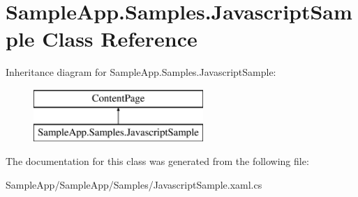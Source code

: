 \hypertarget{class_sample_app_1_1_samples_1_1_javascript_sample}{}\section{Sample\+App.\+Samples.\+Javascript\+Sample Class Reference}
\label{class_sample_app_1_1_samples_1_1_javascript_sample}
Inheritance diagram for Sample\+App.\+Samples.\+Javascript\+Sample\+:\begin{figure}[H]
\begin{center}
\leavevmode
\includegraphics[height=2.000000cm]{class_sample_app_1_1_samples_1_1_javascript_sample}
\end{center}
\end{figure}


The documentation for this class was generated from the following file\+:\begin{DoxyCompactItemize}
\item 
Sample\+App/\+Sample\+App/\+Samples/Javascript\+Sample.\+xaml.\+cs\end{DoxyCompactItemize}
